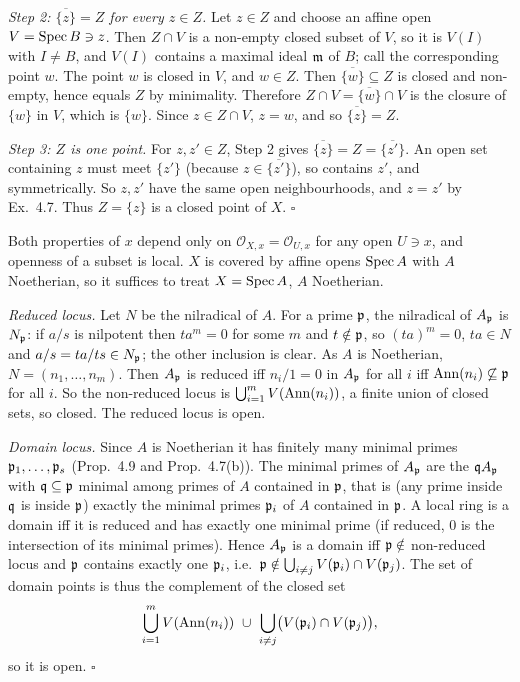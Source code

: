 \documentclass[11pt]{article}
\begin{document}
\emph{Step 2: $\overline{\{z\}}=Z$ for every $z\in Z$.} Let $z\in Z$ and choose an affine open $V=\operatorname{Spec} B\ni z$. Then $Z\cap V$ is a non-empty closed subset of $V$, so it is $V(I)$ with $I\ne B$, and $V(I)$ contains a maximal ideal $\mathfrak m$ of $B$; call the corresponding point $w$. The point $w$ is closed in $V$, and $w\in Z$. Then $\overline{\{w\}}\subseteq Z$ is closed and non-empty, hence equals $Z$ by minimality. Therefore $Z\cap V=\overline{\{w\}}\cap V$ is the closure of $\{w\}$ in $V$, which is $\{w\}$. Since $z\in Z\cap V$, $z=w$, and so $\overline{\{z\}}=Z$.

\emph{Step 3: $Z$ is one point.} For $z,z'\in Z$, Step 2 gives $\overline{\{z\}}=Z=\overline{\{z'\}}$. An open set containing $z$ must meet $\{z'\}$ (because $z\in\overline{\{z'\}}$), so contains $z'$, and symmetrically. So $z,z'$ have the same open neighbourhoods, and $z=z'$ by Ex.~4.7. Thus $Z=\{z\}$ is a closed point of $X$. \hfill$\square$

\pf
Both properties of $x$ depend only on $\mathcal O_{X,x}=\mathcal O_{U,x}$ for any open $U\ni x$, and openness of a subset is local. $X$ is covered by affine opens $\operatorname{Spec} A$ with $A$ Noetherian, so it suffices to treat $X=\operatorname{Spec} A$, $A$ Noetherian.

\emph{Reduced locus.} Let $N$ be the nilradical of $A$. For a prime $\mathfrak p$, the nilradical of $A_\mathfrak p$ is $N_\mathfrak p$: if $a/s$ is nilpotent then $ta^m=0$ for some $m$ and $t\notin\mathfrak p$, so $(ta)^m=0$, $ta\in N$ and $a/s=ta/ts\in N_\mathfrak p$; the other inclusion is clear. As $A$ is Noetherian, $N=(n_1,\dots,n_m)$. Then $A_\mathfrak p$ is reduced iff $n_i/1=0$ in $A_\mathfrak p$ for all $i$ iff $\operatorname{Ann}(n_i)\not\subseteq\mathfrak p$ for all $i$. So the non-reduced locus is $\bigcup_{i=1}^mV(\operatorname{Ann}(n_i))$, a finite union of closed sets, so closed. The reduced locus is open.

\emph{Domain locus.} Since $A$ is Noetherian it has finitely many minimal primes $\mathfrak p_1,\dots,\mathfrak p_s$ (Prop.~4.9 and Prop.~4.7(b)). The minimal primes of $A_\mathfrak p$ are the $\mathfrak q A_\mathfrak p$ with $\mathfrak q\subseteq\mathfrak p$ minimal among primes of $A$ contained in $\mathfrak p$, that is (any prime inside $\mathfrak q$ is inside $\mathfrak p$) exactly the minimal primes $\mathfrak p_i$ of $A$ contained in $\mathfrak p$. A local ring is a domain iff it is reduced and has exactly one minimal prime (if reduced, $0$ is the intersection of its minimal primes). Hence $A_\mathfrak p$ is a domain iff $\mathfrak p\notin$ non-reduced locus and $\mathfrak p$ contains exactly one $\mathfrak p_i$, i.e.\ $\mathfrak p\notin\bigcup_{i\ne j}V(\mathfrak p_i)\cap V(\mathfrak p_j)$. The set of domain points is thus the complement of the closed set
\[ \bigcup_{i=1}^mV(\Ann(n_i))\ \cup\ \bigcup_{i\ne j}\bigl(V(\fp_i)\cap V(\fp_j)\bigr),\]
so it is open. \hfill$\square$
\end{document}
